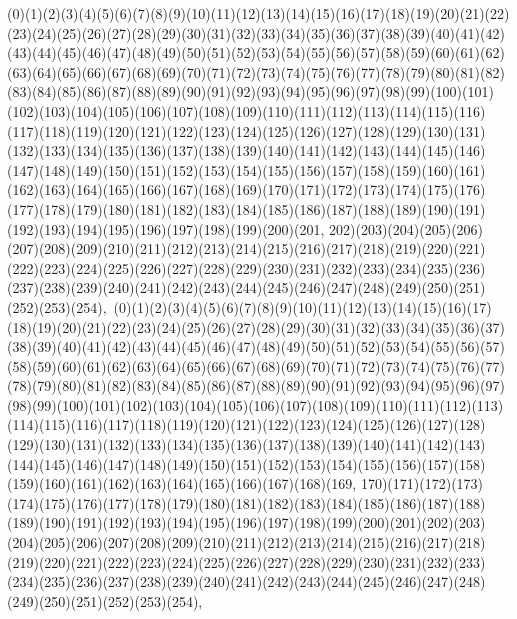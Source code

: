 \documentclass[12pt]{article}
\begin{document}
{(0)(1)(2)(3)(4)(5)(6)(7)(8)(9)(10)(11)(12)(13)(14)(15)(16)(17)(18)(19)(20)(21)(22)(23)(24)(25)(26)(27)(28)(29)(30)(31)(32)(33)(34)(35)(36)(37)(38)(39)(40)(41)(42)(43)(44)(45)(46)(47)(48)(49)(50)(51)(52)(53)(54)(55)(56)(57)(58)(59)(60)(61)(62)(63)(64)(65)(66)(67)(68)(69)(70)(71)(72)(73)(74)(75)(76)(77)(78)(79)(80)(81)(82)(83)(84)(85)(86)(87)(88)(89)(90)(91)(92)(93)(94)(95)(96)(97)(98)(99)(100)(101)(102)(103)(104)(105)(106)(107)(108)(109)(110)(111)(112)(113)(114)(115)(116)(117)(118)(119)(120)(121)(122)(123)(124)(125)(126)(127)(128)(129)(130)(131)(132)(133)(134)(135)(136)(137)(138)(139)(140)(141)(142)(143)(144)(145)(146)(147)(148)(149)(150)(151)(152)(153)(154)(155)(156)(157)(158)(159)(160)(161)(162)(163)(164)(165)(166)(167)(168)(169)(170)(171)(172)(173)(174)(175)(176)(177)(178)(179)(180)(181)(182)(183)(184)(185)(186)(187)(188)(189)(190)(191)(192)(193)(194)(195)(196)(197)(198)(199)(200)(201, 202)(203)(204)(205)(206)(207)(208)(209)(210)(211)(212)(213)(214)(215)(216)(217)(218)(219)(220)(221)(222)(223)(224)(225)(226)(227)(228)(229)(230)(231)(232)(233)(234)(235)(236)(237)(238)(239)(240)(241)(242)(243)(244)(245)(246)(247)(248)(249)(250)(251)(252)(253)(254)$
, 
$
(0)(1)(2)(3)(4)(5)(6)(7)(8)(9)(10)(11)(12)(13)(14)(15)(16)(17)(18)(19)(20)(21)(22)(23)(24)(25)(26)(27)(28)(29)(30)(31)(32)(33)(34)(35)(36)(37)(38)(39)(40)(41)(42)(43)(44)(45)(46)(47)(48)(49)(50)(51)(52)(53)(54)(55)(56)(57)(58)(59)(60)(61)(62)(63)(64)(65)(66)(67)(68)(69)(70)(71)(72)(73)(74)(75)(76)(77)(78)(79)(80)(81)(82)(83)(84)(85)(86)(87)(88)(89)(90)(91)(92)(93)(94)(95)(96)(97)(98)(99)(100)(101)(102)(103)(104)(105)(106)(107)(108)(109)(110)(111)(112)(113)(114)(115)(116)(117)(118)(119)(120)(121)(122)(123)(124)(125)(126)(127)(128)(129)(130)(131)(132)(133)(134)(135)(136)(137)(138)(139)(140)(141)(142)(143)(144)(145)(146)(147)(148)(149)(150)(151)(152)(153)(154)(155)(156)(157)(158)(159)(160)(161)(162)(163)(164)(165)(166)(167)(168)(169, 170)(171)(172)(173)(174)(175)(176)(177)(178)(179)(180)(181)(182)(183)(184)(185)(186)(187)(188)(189)(190)(191)(192)(193)(194)(195)(196)(197)(198)(199)(200)(201)(202)(203)(204)(205)(206)(207)(208)(209)(210)(211)(212)(213)(214)(215)(216)(217)(218)(219)(220)(221)(222)(223)(224)(225)(226)(227)(228)(229)(230)(231)(232)(233)(234)(235)(236)(237)(238)(239)(240)(241)(242)(243)(244)(245)(246)(247)(248)(249)(250)(251)(252)(253)(254)$
, 
$
}
\end{document}

